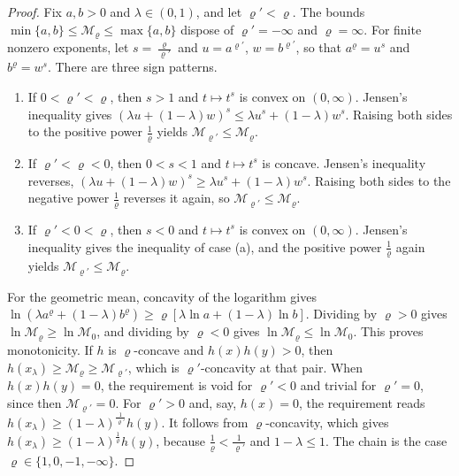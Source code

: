 \begin{proof}
Fix $a, b > 0$ and $\lambda \in (0, 1)$, and let $\varrho' < \varrho$. The bounds
$\min\{a, b\} \leq \mathcal{M}_\varrho \leq \max\{a, b\}$ dispose of $\varrho' = -\infty$ and $\varrho = \infty$. For finite
nonzero exponents, let $s = \frac{\varrho}{\varrho'}$ and $u = a^{\varrho'}$, $w = b^{\varrho'}$, so that
$a^\varrho = u^s$ and $b^\varrho = w^s$. There are three sign patterns.
\begin{enumerate}[label=(\alph*)]
  \item If $0 < \varrho' < \varrho$, then $s > 1$ and $t \mapsto t^s$ is convex on $(0, \infty)$. Jensen's inequality gives
  $(\lambda u + (1 - \lambda)w)^s \leq \lambda u^s + (1 - \lambda)w^s$. Raising both sides to the positive power
  $\frac{1}{\varrho}$ yields $\mathcal{M}_{\varrho'} \leq \mathcal{M}_\varrho$.
  \item If $\varrho' < \varrho < 0$, then $0 < s < 1$ and $t \mapsto t^s$ is concave. Jensen's inequality reverses,
  $(\lambda u + (1 - \lambda)w)^s \geq \lambda u^s + (1 - \lambda)w^s$. Raising both sides to the negative power
  $\frac{1}{\varrho}$ reverses it again, so $\mathcal{M}_{\varrho'} \leq \mathcal{M}_\varrho$.
  \item If $\varrho' < 0 < \varrho$, then $s < 0$ and $t \mapsto t^s$ is convex on $(0, \infty)$. Jensen's inequality
  gives the inequality of case (a), and the positive power $\frac{1}{\varrho}$ again yields
  $\mathcal{M}_{\varrho'} \leq \mathcal{M}_\varrho$.
\end{enumerate}
For the geometric mean, concavity of the logarithm gives
$\ln(\lambda a^\varrho + (1 - \lambda)b^\varrho) \geq \varrho[\lambda\ln a + (1 - \lambda)\ln b]$. Dividing by $\varrho > 0$
gives $\ln\mathcal{M}_\varrho \geq \ln\mathcal{M}_0$, and dividing by $\varrho < 0$ gives $\ln\mathcal{M}_\varrho \leq \ln\mathcal{M}_0$.
This proves monotonicity. If $h$ is $\varrho$-concave and $h(x)h(y) > 0$, then
$h(x_\lambda) \geq \mathcal{M}_\varrho \geq \mathcal{M}_{\varrho'}$, which is $\varrho'$-concavity at that pair. When
$h(x)h(y) = 0$, the requirement is void for $\varrho' < 0$ and trivial for $\varrho' = 0$, since then
$\mathcal{M}_{\varrho'} = 0$. For $\varrho' > 0$ and, say, $h(x) = 0$, the requirement reads
$h(x_\lambda) \geq (1 - \lambda)^{\frac{1}{\varrho'}}h(y)$. It follows from $\varrho$-concavity, which gives
$h(x_\lambda) \geq (1 - \lambda)^{\frac{1}{\varrho}}h(y)$, because $\frac{1}{\varrho} < \frac{1}{\varrho'}$ and $1 - \lambda \leq 1$. The chain
is the case $\varrho \in \{1, 0, -1, -\infty\}$.
\end{proof}

